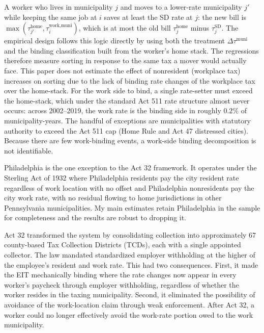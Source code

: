 \documentclass[12pt]{article}
\begin{document}
A worker who lives in municipality $j$ and moves to a lower-rate municipality $j'$
while keeping the same job at $i$ saves at least the SD rate at $j$:
the new bill is $\max(\tau^{\text{home}}_{j'}, \tau^{\text{work,muni}}_i)$,
which is at most the old bill $\tau^{\text{home}}_j$ minus
$\tau^{\text{SD}}_j$. The empirical design follows this logic directly by using both the treatment
$\Delta\tau^{\text{muni}}$ and the binding classification 
built from the worker's home stack. The regressions therefore measure
sorting in response to the same tax a mover would actually face.
This paper does not estimate the effect of nonresident (workplace tax) increases on sorting due to the lack of binding rate changes of the workplace tax over the home-stack. For the work side to bind, a single rate-setter must exceed the home-stack, which under the standard Act 511 rate structure almost never occurs: across 2002–2019, the work rate is the binding side in roughly $0.2\%$ of municipality-years. The handful of exceptions are municipalities with statutory authority to exceed the Act 511 cap (Home Rule and Act 47 distressed cities). Because there are few work-binding events, a work-side binding decomposition is not identifiable.

Philadelphia is the one exception to the Act 32 framework. It operates under
the Sterling Act of 1932 where Philadelphia residents pay the city resident
rate regardless of work location with no offset and Philadelphia
nonresidents pay the city work rate, with no residual flowing
to home jurisdictions in other Pennsylvania municipalities. My main estimates
retain Philadelphia in the sample for completeness and the results are robust
to dropping it.

Act 32 transformed the system by consolidating collection into
approximately 67 county-based Tax Collection Districts (TCDs), each with a single appointed collector.
The law mandated standardized employer withholding at the higher of
the employee's resident and work rate. This had two consequences.
First, it made the EIT mechanically binding where the rate changes now
appear in every worker's paycheck through employer withholding,
regardless of whether the worker resides in the taxing municipality.
Second, it eliminated the possibility of avoidance
of the work-location claim through weak enforcement.
After Act 32, a worker could no longer effectively avoid the
work-rate portion owed to the work municipality.
\end{document}
